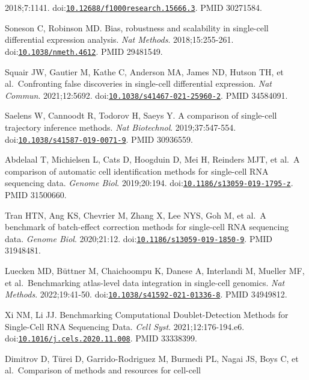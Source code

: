 \documentclass[11pt]{article}
\begin{document}
\begin{enumerate}[label={[\arabic*]},leftmargin=2.6em,labelsep=0.5em,itemsep=1.5pt]
  2018;7:1141.
  doi:\href{https://doi.org/10.12688/f1000research.15666.3}{\nolinkurl{10.12688/f1000research.15666.3}}.
  PMID 30271584.
\item
  Soneson C, Robinson MD. Bias, robustness and scalability in
  single-cell differential expression analysis. \emph{Nat Methods}.
  2018;15:255-261.
  doi:\href{https://doi.org/10.1038/nmeth.4612}{\nolinkurl{10.1038/nmeth.4612}}.
  PMID 29481549.
\item
  Squair JW, Gautier M, Kathe C, Anderson MA, James ND, Hutson TH, et
  al.~Confronting false discoveries in single-cell differential
  expression. \emph{Nat Commun}. 2021;12:5692.
  doi:\href{https://doi.org/10.1038/s41467-021-25960-2}{\nolinkurl{10.1038/s41467-021-25960-2}}.
  PMID 34584091.
\item
  Saelens W, Cannoodt R, Todorov H, Saeys Y. A comparison of single-cell
  trajectory inference methods. \emph{Nat Biotechnol}. 2019;37:547-554.
  doi:\href{https://doi.org/10.1038/s41587-019-0071-9}{\nolinkurl{10.1038/s41587-019-0071-9}}.
  PMID 30936559.
\item
  Abdelaal T, Michielsen L, Cats D, Hoogduin D, Mei H, Reinders MJT, et
  al.~A comparison of automatic cell identification methods for
  single-cell RNA sequencing data. \emph{Genome Biol}. 2019;20:194.
  doi:\href{https://doi.org/10.1186/s13059-019-1795-z}{\nolinkurl{10.1186/s13059-019-1795-z}}.
  PMID 31500660.
\item
  Tran HTN, Ang KS, Chevrier M, Zhang X, Lee NYS, Goh M, et al.~A
  benchmark of batch-effect correction methods for single-cell RNA
  sequencing data. \emph{Genome Biol}. 2020;21:12.
  doi:\href{https://doi.org/10.1186/s13059-019-1850-9}{\nolinkurl{10.1186/s13059-019-1850-9}}.
  PMID 31948481.
\item
  Luecken MD, Büttner M, Chaichoompu K, Danese A, Interlandi M, Mueller
  MF, et al.~Benchmarking atlas-level data integration in single-cell
  genomics. \emph{Nat Methods}. 2022;19:41-50.
  doi:\href{https://doi.org/10.1038/s41592-021-01336-8}{\nolinkurl{10.1038/s41592-021-01336-8}}.
  PMID 34949812.
\item
  Xi NM, Li JJ. Benchmarking Computational Doublet-Detection Methods for
  Single-Cell RNA Sequencing Data. \emph{Cell Syst}. 2021;12:176-194.e6.
  doi:\href{https://doi.org/10.1016/j.cels.2020.11.008}{\nolinkurl{10.1016/j.cels.2020.11.008}}.
  PMID 33338399.
\item
  Dimitrov D, Türei D, Garrido-Rodriguez M, Burmedi PL, Nagai JS, Boys
  C, et al.~Comparison of methods and resources for cell-cell

\end{enumerate}
\end{document}
